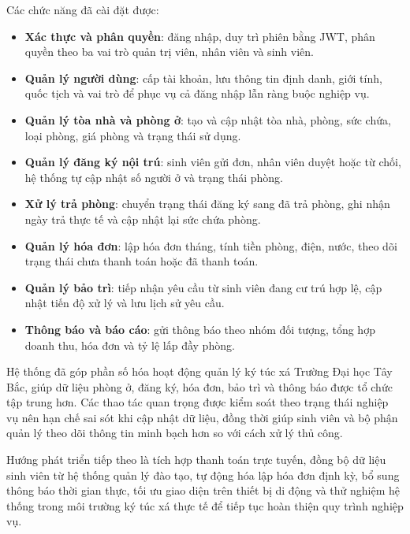 \documentclass[13pt,a4paper]{extarticle}
\begin{document}
	Các chức năng đã cài đặt được:
	\begin{itemize}
		\item \textbf{Xác thực và phân quyền}: đăng nhập, duy trì phiên bằng JWT, phân quyền theo ba vai trò quản trị viên, nhân viên và sinh viên.
		\item \textbf{Quản lý người dùng}: cấp tài khoản, lưu thông tin định danh, giới tính, quốc tịch và vai trò để phục vụ cả đăng nhập lẫn ràng buộc nghiệp vụ.
		\item \textbf{Quản lý tòa nhà và phòng ở}: tạo và cập nhật tòa nhà, phòng, sức chứa, loại phòng, giá phòng và trạng thái sử dụng.
		\item \textbf{Quản lý đăng ký nội trú}: sinh viên gửi đơn, nhân viên duyệt hoặc từ chối, hệ thống tự cập nhật số người ở và trạng thái phòng.
		\item \textbf{Xử lý trả phòng}: chuyển trạng thái đăng ký sang đã trả phòng, ghi nhận ngày trả thực tế và cập nhật lại sức chứa phòng.
		\item \textbf{Quản lý hóa đơn}: lập hóa đơn tháng, tính tiền phòng, điện, nước, theo dõi trạng thái chưa thanh toán hoặc đã thanh toán.
		\item \textbf{Quản lý bảo trì}: tiếp nhận yêu cầu từ sinh viên đang cư trú hợp lệ, cập nhật tiến độ xử lý và lưu lịch sử yêu cầu.
		\item \textbf{Thông báo và báo cáo}: gửi thông báo theo nhóm đối tượng, tổng hợp doanh thu, hóa đơn và tỷ lệ lấp đầy phòng.
	\end{itemize}
	
	Hệ thống đã góp phần số hóa hoạt động quản lý ký túc xá Trường Đại học Tây Bắc, giúp dữ liệu phòng ở, đăng ký, hóa đơn, bảo trì và thông báo được tổ chức tập trung hơn. Các thao tác quan trọng được kiểm soát theo trạng thái nghiệp vụ nên hạn chế sai sót khi cập nhật dữ liệu, đồng thời giúp sinh viên và bộ phận quản lý theo dõi thông tin minh bạch hơn so với cách xử lý thủ công.
	
	Hướng phát triển tiếp theo là tích hợp thanh toán trực tuyến, đồng bộ dữ liệu sinh viên từ hệ thống quản lý đào tạo, tự động hóa lập hóa đơn định kỳ, bổ sung thông báo thời gian thực, tối ưu giao diện trên thiết bị di động và thử nghiệm hệ thống trong môi trường ký túc xá thực tế để tiếp tục hoàn thiện quy trình nghiệp vụ.
	
\end{document}
